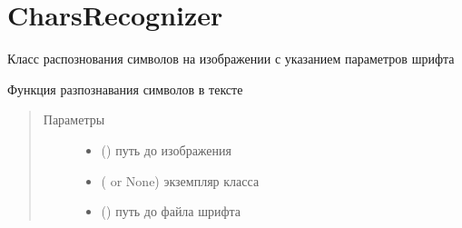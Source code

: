 \documentclass[letterpaper,10pt,russian]{sphinxmanual}
\begin{document}
\section{CharsRecognizer}
\label{\detokenize{CharsRecognizer:charsrecognizer}}\label{\detokenize{CharsRecognizer::doc}}

\begin{fulllineitems}
\label{\detokenize{CharsRecognizer:CharsRecognizer.CharsRecognizer}}
Класс распознования символов на изображении с указанием параметров шрифта

\begin{fulllineitems}
\label{\detokenize{CharsRecognizer:CharsRecognizer.CharsRecognizer.tryToRecognizeWithFont}}
Функция разпознавания символов в тексте
\begin{quote}\begin{description}
\item[{Параметры}] \leavevmode\begin{itemize}
\item {} 
 () \textendash{} путь до изображения

\item {} 
 ({\hyperref[\detokenize{BaseImage:core.LabImage}]{}} or None) \textendash{} экземпляр класса {\hyperref[\detokenize{BaseImage:core.LabImage}]{}}

\item {} 
 () \textendash{} путь до файла шрифта


\end{itemize}
\end{description}
\end{quote}
\end{fulllineitems}
\end{fulllineitems}
\end{document}
